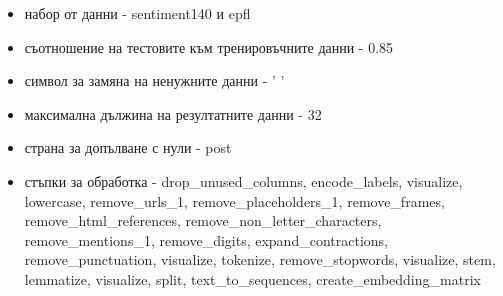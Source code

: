\documentclass{article}
\begin{document}
\begin{itemize}
  \begin{itemize}
    \item набор от данни - sentiment140 и epfl
    \item съотношение на тестовите към тренировъчните данни - 0.85
    \item символ за замяна на ненужните данни - ' '
    \item максимална дължина на резултатните данни - 32
    \item страна за допълване с нули - post
    \item стъпки за обработка - drop\_unused\_columns, encode\_labels, visualize, lowercase, remove\_urls\_1,
    remove\_placeholders\_1, remove\_frames, remove\_html\_references, remove\_non\_letter\_characters,
    remove\_mentions\_1, remove\_digits, expand\_contractions, remove\_punctuation, visualize, tokenize,
    remove\_stopwords, visualize, stem, lemmatize, visualize, split, text\_to\_sequences, create\_embedding\_matrix
  \end{itemize}


\end{itemize}
\end{document}
